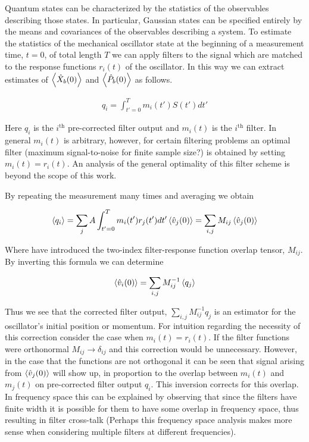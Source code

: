 \documentclass[12pt]{article}
\begin{document}
Quantum states can be characterized by the statistics of the observables describing those states. In particular, Gaussian states can be specified entirely by the means and covariances of the observables describing a system. To estimate the statistics of the mechanical oscillator state at the beginning of a measurement time, $t=0$, of total length $T$ we can apply filters to the signal which are matched to the response functions $r_i(t)$ of the oscillator. In this way we can extract estimates of $\Braket{\hat{X}_b(0)}$ and $\Braket{\hat{P}_b(0)}$ as follows.

\begin{align}
q_i = \int_{t'=0}^T m_i(t') S(t') dt'
\end{align}

Here $q_i$ is the $i^{\text{th}}$ pre-corrected filter output and $m_i(t)$ is the $i^{\text{th}}$ filter. In general $m_i(t)$ is arbitrary, however, for certain filtering problems an optimal filter (maximum signal-to-noise for finite sample size?) is obtained by setting $m_i(t) = r_i(t)$. An analysis of the general optimality of this filter scheme is beyond the scope of this work.

By repeating the measurement many times and averaging we obtain

\begin{align}
\Braket{q_i} = \sum_j A \int_{t'=0}^T m_i(t') r_j(t') dt' \Braket{\hat{v}_j(0)} = \sum_{i,j} M_{ij} \Braket{\hat{v}_j(0)}
\end{align}

Where have introduced the two-index filter-response function overlap tensor, $M_{ij}$. By inverting this formula we can determine

\begin{align}
\braket{\hat{v}_i(0)} = \sum_{i,j} M^{-1}_{ij} \Braket{q_j}
\end{align}

Thus we see that the corrected filter output, $\sum_{i,j} M_{ij}^{-1} q_j$ is an estimator for the oscillator's initial position or momentum. For intuition regarding the necessity of this correction consider the case when $m_i(t) = r_i(t)$. If the filter functions were orthonormal $M_{ij} \rightarrow \delta_{ij}$ and this correction would be unnecessary. However, in the case that the functions are not orthogonal it can be seen that signal arising from $\Braket{\hat{v}_j(0)}$ will show up, in proportion to the overlap between $m_i(t)$ and $m_j(t)$ on pre-corrected filter output $q_i$. This inversion corrects for this overlap. In frequency space this can be explained by observing that since the filters have finite width it is possible for them to have some overlap in frequency space, thus resulting in filter cross-talk (Perhaps this frequency space analysis makes more sense when considering multiple filters at different frequencies).
\end{document}
